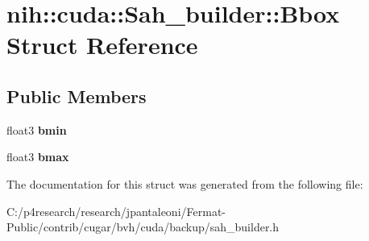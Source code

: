 \hypertarget{structnih_1_1cuda_1_1_sah__builder_1_1_bbox}{}\section{nih\+:\+:cuda\+:\+:Sah\+\_\+builder\+:\+:Bbox Struct Reference}
\label{structnih_1_1cuda_1_1_sah__builder_1_1_bbox}
\subsection*{Public Members}
\begin{DoxyCompactItemize}
\item 
\mbox{\label{structnih_1_1cuda_1_1_sah__builder_1_1_bbox_a93f3cd24b09daa61e0bef38afe40ba2a}} 
float3 {\bfseries bmin}
\item 
\mbox{\label{structnih_1_1cuda_1_1_sah__builder_1_1_bbox_a07811ae5c67d6910fb26524d37c5614b}} 
float3 {\bfseries bmax}
\end{DoxyCompactItemize}


The documentation for this struct was generated from the following file\+:\begin{DoxyCompactItemize}
\item 
C\+:/p4research/research/jpantaleoni/\+Fermat-\/\+Public/contrib/cugar/bvh/cuda/backup/sah\+\_\+builder.\+h\end{DoxyCompactItemize}

